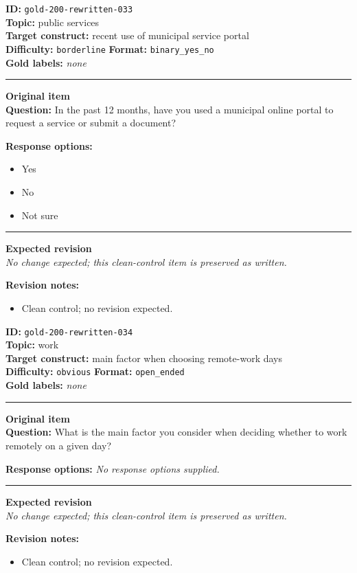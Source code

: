 \documentclass[10pt,a4paper]{article}
\newcommand{\sectionline}{\vspace{0.15em}\hrule\vspace{0.35em}}
\begin{document}
\begin{tcolorbox}[colframe=CleanGreen,colback=white,colbacktitle=CleanGreen!9,coltitle=black,title={Item 033\hfill Clean control}]
\textbf{ID:} \texttt{gold-200-rewritten-033}\\
\textbf{Topic:} public services\\
\textbf{Target construct:} recent use of municipal service portal\\
\textbf{Difficulty:} \texttt{borderline} \quad \textbf{Format:} \texttt{binary\_yes\_no}\\
\textbf{Gold labels:} \textit{none}\\
\sectionline
\textbf{Original item}\\
\textbf{Question:} In the past 12 months, have you used a municipal online portal to request a service or submit a document?
\par\textbf{Response options:}
\begin{itemize}
\item Yes
\item No
\item Not sure
\end{itemize}
\sectionline
\textbf{Expected revision}\\
\textit{No change expected; this clean-control item is preserved as written.}
\par\textbf{Revision notes:}
\begin{itemize}
\item Clean control; no revision expected.
\end{itemize}
\end{tcolorbox}
\begin{tcolorbox}[colframe=CleanGreen,colback=white,colbacktitle=CleanGreen!9,coltitle=black,title={Item 034\hfill Clean control}]
\textbf{ID:} \texttt{gold-200-rewritten-034}\\
\textbf{Topic:} work\\
\textbf{Target construct:} main factor when choosing remote-work days\\
\textbf{Difficulty:} \texttt{obvious} \quad \textbf{Format:} \texttt{open\_ended}\\
\textbf{Gold labels:} \textit{none}\\
\sectionline
\textbf{Original item}\\
\textbf{Question:} What is the main factor you consider when deciding whether to work remotely on a given day?
\par\textbf{Response options:}
\textit{No response options supplied.}
\sectionline
\textbf{Expected revision}\\
\textit{No change expected; this clean-control item is preserved as written.}
\par\textbf{Revision notes:}
\begin{itemize}
\item Clean control; no revision expected.
\end{itemize}
\end{tcolorbox}
\end{document}
